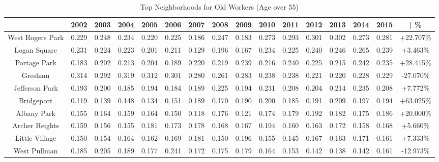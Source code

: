 \documentclass{article}
\theoremstyle{definition}
\theoremstyle{remark}
\begin{document}
\begin{table}[h]\centering
\caption{Top Neighborhoods for Old Workers (Age over 55)}\label{thelabel}
\begin{adjustbox}{center}
\begin{tabular}{||c | c c c c c c c c c c c c c c | c ||} 
 \hline
 & 2002 & 2003 & 2004 & 2005 & 2006 & 2007 & 2008 & 2009 & 2010 & 2011 & 2012 & 2013 & 2014 & 2015 & | \%\\[0.5ex] 
 \hline\hline
West Rogers Park & 0.229 & 0.248 & 0.234 & 0.220 & 0.225 & 0.186 & 0.247 & 0.183 & 0.273 & 0.293 & 0.301 & 0.302 & 0.273 & 0.281 & +22.707\% \\
Logan Square     & 0.231 & 0.224 & 0.223 & 0.201 & 0.211 & 0.129 & 0.196 & 0.167 & 0.234 & 0.225 & 0.240 & 0.246 & 0.265 & 0.239 & +3.463\% \\
Portage Park     & 0.183 & 0.202 & 0.213 & 0.204 & 0.189 & 0.220 & 0.219 & 0.239 & 0.216 & 0.240 & 0.225 & 0.215 & 0.242 & 0.235 & +28.415\% \\
Gresham          & 0.314 & 0.292 & 0.319 & 0.312 & 0.301 & 0.280 & 0.261 & 0.283 & 0.238 & 0.238 & 0.221 & 0.220 & 0.228 & 0.229 & -27.070\% \\
Jefferson Park   & 0.193 & 0.200 & 0.185 & 0.194 & 0.184 & 0.189 & 0.225 & 0.194 & 0.231 & 0.208 & 0.204 & 0.214 & 0.235 & 0.208 & +7.772\% \\
Bridgeport       & 0.119 & 0.139 & 0.148 & 0.134 & 0.151 & 0.189 & 0.170 & 0.190 & 0.200 & 0.185 & 0.191 & 0.209 & 0.197 & 0.194 & +63.025\% \\
Albany Park      & 0.155 & 0.164 & 0.159 & 0.164 & 0.150 & 0.118 & 0.176 & 0.121 & 0.174 & 0.179 & 0.192 & 0.182 & 0.175 & 0.186 & +20.000\% \\
Archer Heights   & 0.159 & 0.156 & 0.155 & 0.181 & 0.173 & 0.178 & 0.168 & 0.167 & 0.194 & 0.160 & 0.163 & 0.172 & 0.158 & 0.168 & +5.660\% \\
Little Village   & 0.150 & 0.154 & 0.164 & 0.162 & 0.169 & 0.181 & 0.150 & 0.196 & 0.155 & 0.145 & 0.167 & 0.163 & 0.171 & 0.161 & +7.333\% \\
West Pullman     & 0.185 & 0.205 & 0.189 & 0.177 & 0.241 & 0.172 & 0.175 & 0.179 & 0.164 & 0.153 & 0.142 & 0.138 & 0.142 & 0.161 & -12.973\% \\
 \hline
 \end{tabular}

\end{adjustbox}
\end{table}
\end{document}

